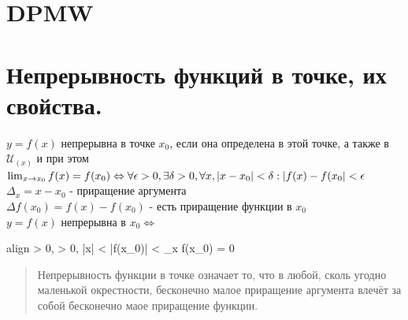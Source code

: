 \documentclass[oneside]{book}
\newcommand{\boxedeq}[2]{\begin{empheq}[box={\fboxsep=6pt\fbox}]{align}\label{#1}#2\end{empheq}}
\begin{document}
\begin{enumerate}

\chapter{DPMW}
\pagebreak

\chapter[Непрерывность]{Непрерывность функций в точке, их свойства.\\}
$y = f(x)$ непрерывна в точке $x_0$, если она определена в этой точке, а также в $\mathcal{U}_{(x)}$ и при этом
$\lim_{x \rightarrow x_0}{f(x) = f(x_0) \Leftrightarrow \\ \forall \epsilon > 0, \exists \delta > 0, \forall x, |x - x_0|
< \delta : |f(x) - f(x_0| < \epsilon }$
$\Delta_x = x-x_0$ - приращение аргумента \\
$\Delta f(x_0) = f(x) - f(x_0)$ - есть приращение функции в $x_0$ \\
$y = f(x)$ непрерывна в $x_0 \Leftrightarrow$
\boxedeq{eq:*}{
    \forall \epsilon > 0, \exists \delta > 0, |\Delta x| < \delta \Rightarrow |\Delta f(x_0)|
    < \epsilon \Leftrightarrow \lim_{\Delta x \rightarrow 0}{\Delta f(x_0)} = 0
}
\begin{quote}
    Непрерывность функции в точке означает то, что в любой, сколь угодно маленькой окрестности, бесконечно малое приращение аргумента
    влечёт за собой бесконечно маое приращение функции.
\end{quote}


\end{enumerate}
\end{document}

